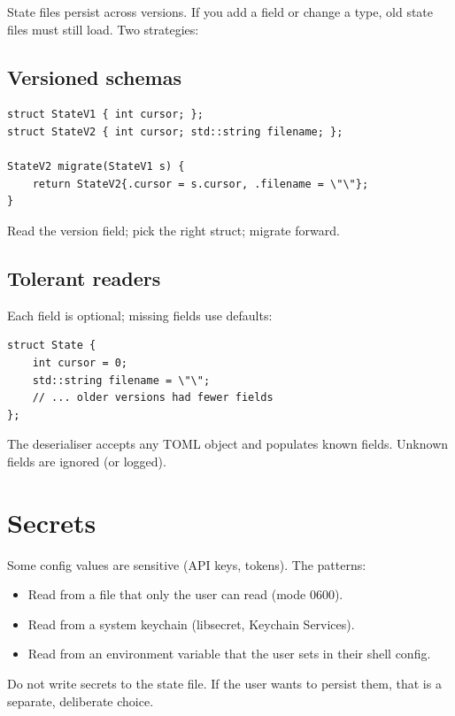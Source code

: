 State files persist across versions. If you add a field or
change a type, old state files must still load. Two strategies:

\subsection*{Versioned schemas}

\begin{lstlisting}
struct StateV1 { int cursor; };
struct StateV2 { int cursor; std::string filename; };

StateV2 migrate(StateV1 s) {
    return StateV2{.cursor = s.cursor, .filename = \"\"};
}
\end{lstlisting}

Read the version field; pick the right struct; migrate forward.

\subsection*{Tolerant readers}

Each field is optional; missing fields use defaults:

\begin{lstlisting}
struct State {
    int cursor = 0;
    std::string filename = \"\";
    // ... older versions had fewer fields
};
\end{lstlisting}

The deserialiser accepts any TOML object and populates known
fields. Unknown fields are ignored (or logged).

\section{Secrets}

Some config values are sensitive (API keys, tokens). The
patterns:

\begin{itemize}[leftmargin=*]
  \item Read from a file that only the user can read
    (mode 0600).
  \item Read from a system keychain (libsecret, Keychain
    Services).
  \item Read from an environment variable that the user sets
    in their shell config.
\end{itemize}

Do not write secrets to the state file. If the user wants to
persist them, that is a separate, deliberate choice.


